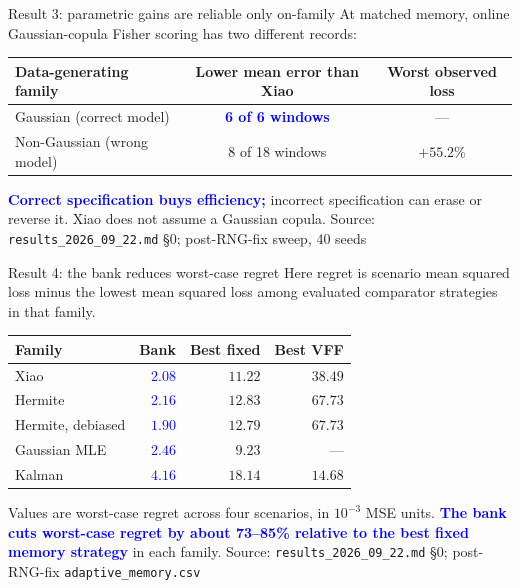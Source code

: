 \documentclass[aspectratio=169,11pt]{beamer}
\newcommand{\good}[1]{\textcolor{blue}{\textbf{#1}}}
\newcommand{\caution}[1]{\textcolor{rust}{\textbf{#1}}}
\newcommand{\src}[1]{\vfill{\tiny\color{gray}Source: #1}}
\begin{document}
\begin{frame}{Result 3: parametric gains are reliable only on-family}
  At matched memory, online Gaussian-copula Fisher scoring has two different records:
  \begin{center}
  \begin{tabular}{lcc}
    \toprule
    Data-generating family & Lower mean error than Xiao & Worst observed loss\\
    \midrule
    Gaussian (correct model) & \good{6 of 6 windows} & ---\\
    Non-Gaussian (wrong model) & 8 of 18 windows & \caution{$+55.2\%$}\\
    \bottomrule
  \end{tabular}
  \end{center}
  \medskip
  \good{Correct specification buys efficiency;} incorrect specification can erase or
  reverse it. Xiao does not assume a Gaussian copula.
  \src{\texttt{results\_2026\_09\_22.md} \S0; post-RNG-fix sweep, 40 seeds}
\end{frame}

\begin{frame}{Result 4: the bank reduces worst-case regret}
  Here regret is scenario mean squared loss minus the lowest mean squared loss
  among evaluated comparator strategies in that family.
  \begin{center}
  \begin{tabular}{lrrr}
    \toprule
    Family & Bank & Best fixed & Best VFF\\
    \midrule
    Xiao & \good{$2.08$} & $11.22$ & $38.49$\\
    Hermite & \good{$2.16$} & $12.83$ & $67.73$\\
    Hermite, debiased & \good{$1.90$} & $12.79$ & $67.73$\\
    Gaussian MLE & \good{$2.46$} & $9.23$ & ---\\
    Kalman & \good{$4.16$} & $18.14$ & $14.68$\\
    \bottomrule
  \end{tabular}
  \end{center}
  \small Values are worst-case regret across four scenarios, in $10^{-3}$ MSE units.
  \good{The bank cuts worst-case regret by about 73--85\% relative to the best
  fixed memory strategy} in each family.
  \src{\texttt{results\_2026\_09\_22.md} \S0; post-RNG-fix \texttt{adaptive\_memory.csv}}
\end{frame}
\end{document}
